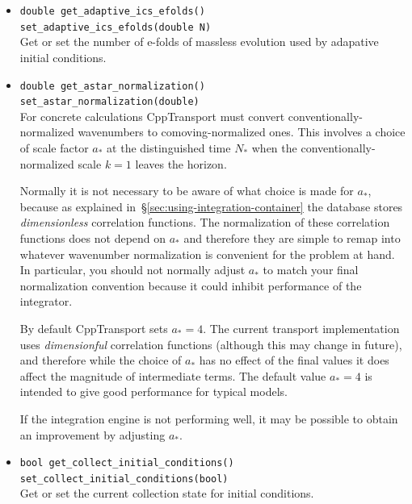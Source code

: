 \documentclass[11pt,a4paper]{article}
\newcommand{\Nstar}{N_{\ast}}
\newcommand{\astar}{a_{\ast}}
\newcommand{\packagefont}{\sffamily}
\newcommand{\CppTransport}{{\packagefont CppTransport}}
\begin{document}
\begin{itemize}
    \item \texttt{double get_adaptive_ics_efolds()} \\
    \texttt{set_adaptive_ics_efolds(double N)} \\
    Get or set the number of e-folds of massless evolution used by adapative
    initial conditions.
    
    \item \texttt{double get_astar_normalization()} \\
    \texttt{set_astar_normalization(double)} \\
    \label{method:set_astar_normalization}
    For concrete calculations {\CppTransport} must convert conventionally-normalized
    wavenumbers to comoving-normalized ones.
    This involves a choice of scale factor $\astar$ at the distinguished
    time $\Nstar$ when the conventionally-normalized scale $k=1$ leaves the
    horizon.

    Normally it is not necessary to be aware of what choice is made for
    $\astar$, because as explained in~\S\ref{sec:using-integration-container}
    the database stores \emph{dimensionless} correlation functions.
    The normalization of these correlation functions does not depend on
    $\astar$
    and therefore they are simple to remap into whatever wavenumber
    normalization is convenient for the problem at hand. In particular, you should
    not normally adjust $\astar$
    to match your final normalization convention because it could inhibit
    performance of the integrator.
     
    By default {\CppTransport} sets
    $\astar = 4$.
    The current transport implementation uses
    \emph{dimensionful} correlation
    functions (although this may change in future),
    and therefore while the choice of $\astar$ has no effect
    of the final values it does affect the magnitude of intermediate
    terms.
    The default value $\astar = 4$ is intended to give good performance
    for typical models.
    
    If the integration engine is not performing well, it may be possible
    to obtain an improvement by adjusting $\astar$.
    
    \item \texttt{bool get_collect_initial_conditions()} \\
    \texttt{set_collect_initial_conditions(bool)} \\
    Get or set the current collection state for initial conditions.
    

\end{itemize}
\end{document}
